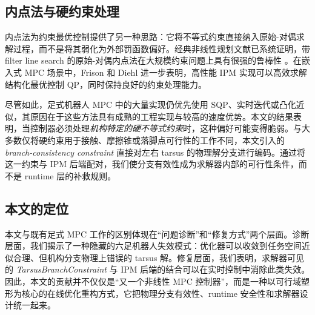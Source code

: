 \subsection{内点法与硬约束处理}

内点法为约束最优控制提供了另一种思路：它将不等式约束直接纳入原始-对偶求解过程，而不是将其弱化为外部罚函数偏好。经典非线性规划文献已系统证明，带 filter line search 的原始-对偶内点法在大规模约束问题上具有很强的鲁棒性 \cite{wachter2006ipopt}。在嵌入式 MPC 场景中，Frison 和 Diehl \cite{frison2020hpipm} 进一步表明，高性能 IPM 实现可以高效求解结构化最优控制 QP，同时保持良好的约束处理能力。

尽管如此，足式机器人 MPC 中的大量实现仍优先使用 SQP、实时迭代或凸化近似，其原因在于这些方法具有成熟的工程实现与较高的速度优势。本文的结果表明，当控制器必须处理\emph{机构特定的硬不等式约束}时，这种偏好可能变得脆弱。与大多数仅将硬约束用于接触、摩擦锥或落脚点可行性的工作不同，本文引入的 \emph{branch-consistency constraint} 直接对左右 tarsus 的物理解分支进行编码。通过将这一约束与 IPM 后端配对，我们使分支有效性成为求解器内部的可行性条件，而不是 runtime 层的补救规则。

\subsection{本文的定位}

本文与既有足式 MPC 工作的区别体现在“问题诊断”和“修复方式”两个层面。诊断层面，我们揭示了一种隐藏的六足机器人失效模式：优化器可以收敛到任务空间近似合理、但机构分支物理上错误的 tarsus 解。修复层面，我们表明，求解器可见的 \emph{TarsusBranchConstraint} 与 IPM 后端的结合可以在实时控制中消除此类失效。因此，本文的贡献并不仅仅是“又一个非线性 MPC 控制器”，而是一种以可行域塑形为核心的在线优化重构方式，它把物理分支有效性、runtime 安全性和求解器设计统一起来。
